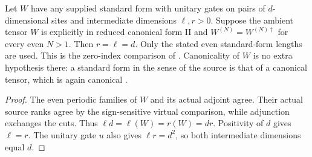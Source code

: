 \begin{lemma}
    \label{lem:mpu_supplied_standard_form_adjoint_zero_index}
    \leanok
    Let $W$ have any supplied standard form with unitary gates on pairs
    of $d$-dimensional sites and intermediate dimensions $\ell,r>0$.
    Suppose the ambient tensor $W$ is explicitly in reduced canonical
    form II and $W^{(N)}=W^{(N)\dagger}$ for every even $N>1$.
    Then $r=\ell=d$. Only the stated even standard-form lengths are used.
    This is the zero-index comparison of
    \cite[lines~1201--1252]{Cirac2017MPU}. Canonicality of $W$ is no extra
    hypothesis there: a standard form in the sense of the source is that of a
    canonical tensor, which is again canonical
    \cite{gap:mpu_standard_form_canonical_convention}.
\end{lemma}

\begin{proof}\leanok
    The even periodic families of $W$ and its actual adjoint agree.
    Their actual source ranks agree by the sign-sensitive virtual
    comparison, while adjunction exchanges the cuts. Thus
    $\ell d=\ell(W)=r(W)=dr$. Positivity of $d$ gives $\ell=r$.
    The unitary gate $u$ also gives $\ell r=d^2$, so both intermediate
    dimensions equal $d$.
\end{proof}

